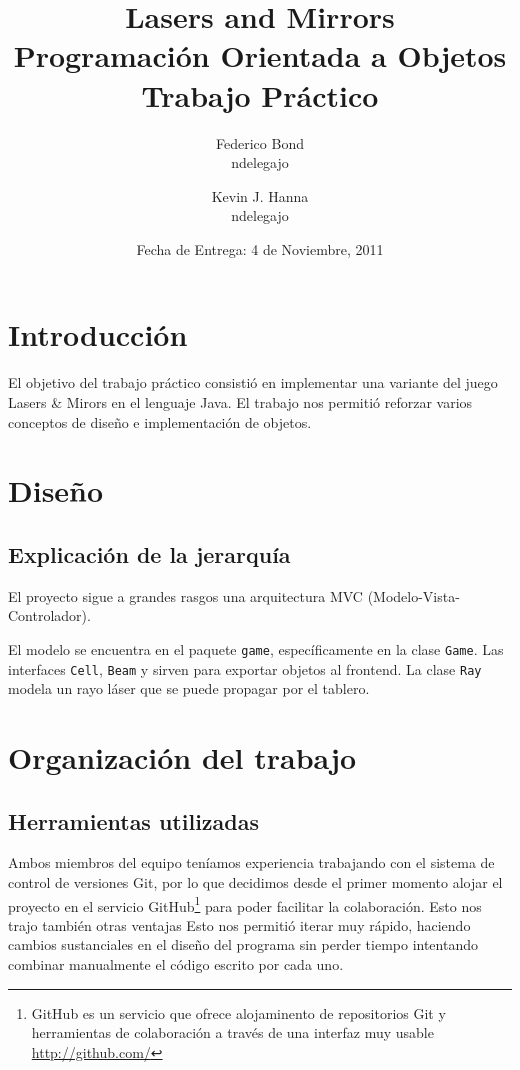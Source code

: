 \documentclass[a4paper, 11pt]{article}
\title{\Huge {Lasers and Mirrors} \\ Programación Orientada a Objetos\\[0.7cm] Trabajo Práctico}
\author{Federico Bond\\ndelegajo \and Kevin J. Hanna\\ndelegajo}
\date{Fecha de Entrega: 4 de Noviembre, 2011}
\begin{document}
 

\maketitle

\newpage
\tableofcontents
\clearpage 

\section{Introducción}
El objetivo del trabajo práctico consistió en implementar una variante del juego Lasers \& Mirors en el lenguaje Java. El trabajo nos permitió reforzar varios conceptos de diseño e implementación de objetos.

\section{Diseño}

	\subsection{Explicación de la jerarquía}
	El proyecto sigue a grandes rasgos una arquitectura MVC (Modelo-Vista-Controlador).

	El modelo se encuentra en el paquete \texttt{game}, específicamente en la clase \texttt{Game}. Las interfaces \texttt{Cell}, \texttt{Beam} y  sirven para exportar objetos al frontend. La clase \texttt{Ray} modela un rayo láser que se puede propagar por el tablero.

\section{Organización del trabajo}

	\subsection{Herramientas utilizadas}
	Ambos miembros del equipo teníamos experiencia trabajando con el sistema de control de versiones Git, por lo que decidimos desde el primer momento alojar el proyecto en el servicio GitHub\footnote{GitHub es un servicio que ofrece alojaminento de repositorios Git y herramientas de colaboración a través de una interfaz muy usable \href{http://github.com/}{http://github.com/}} para poder facilitar la colaboración. Esto nos trajo también otras ventajas Esto nos permitió iterar muy rápido, haciendo cambios sustanciales en el diseño del programa sin perder tiempo intentando combinar manualmente el código escrito por cada uno.
\end{document}
